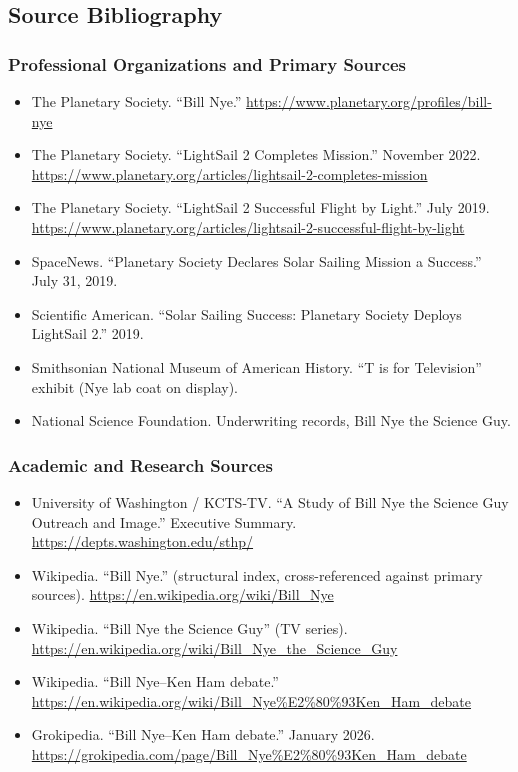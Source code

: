 \documentclass[11pt,letterpaper]{article}
\begin{document}
\subsection{Source Bibliography}

\subsubsection*{Professional Organizations and Primary Sources}
\begin{itemize}[leftmargin=*, itemsep=2pt]
  \item The Planetary Society. ``Bill Nye.'' \url{https://www.planetary.org/profiles/bill-nye}
  \item The Planetary Society. ``LightSail 2 Completes Mission.'' November 2022. \url{https://www.planetary.org/articles/lightsail-2-completes-mission}
  \item The Planetary Society. ``LightSail 2 Successful Flight by Light.'' July 2019. \url{https://www.planetary.org/articles/lightsail-2-successful-flight-by-light}
  \item SpaceNews. ``Planetary Society Declares Solar Sailing Mission a Success.'' July 31, 2019.
  \item Scientific American. ``Solar Sailing Success: Planetary Society Deploys LightSail 2.'' 2019.
  \item Smithsonian National Museum of American History. ``T is for Television'' exhibit (Nye lab coat on display).
  \item National Science Foundation. Underwriting records, Bill Nye the Science Guy.
\end{itemize}

\subsubsection*{Academic and Research Sources}
\begin{itemize}[leftmargin=*, itemsep=2pt]
  \item University of Washington / KCTS-TV. ``A Study of Bill Nye the Science Guy Outreach and Image.'' Executive Summary. \url{https://depts.washington.edu/sthp/}
  \item Wikipedia. ``Bill Nye.'' (structural index, cross-referenced against primary sources). \url{https://en.wikipedia.org/wiki/Bill_Nye}
  \item Wikipedia. ``Bill Nye the Science Guy'' (TV series). \url{https://en.wikipedia.org/wiki/Bill_Nye_the_Science_Guy}
  \item Wikipedia. ``Bill Nye--Ken Ham debate.'' \url{https://en.wikipedia.org/wiki/Bill_Nye\%E2\%80\%93Ken_Ham_debate}
  \item Grokipedia. ``Bill Nye--Ken Ham debate.'' January 2026. \url{https://grokipedia.com/page/Bill_Nye\%E2\%80\%93Ken_Ham_debate}
\end{itemize}
\end{document}
